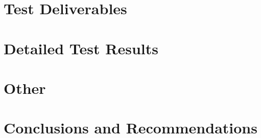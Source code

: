 \documentclass[11pt]{article}
\begin{document}
\section{Test Deliverables}

\section{Detailed Test Results}

\section{Other}

\section{Conclusions and Recommendations}
\end{document}
